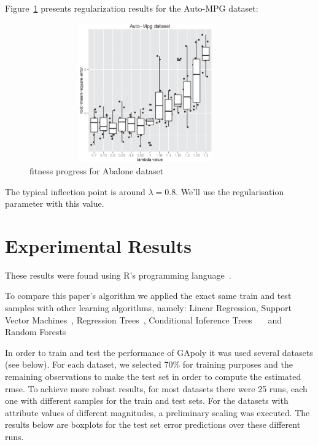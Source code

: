 \documentclass[a4paper, 12pt]{article}
\begin{document}
Figure~\ref{Auto-Mpg_dataset_lambdas} presents regularization results for the Auto-MPG dataset:

\begin{figure}[htb]
	\begin{center}
		\includegraphics[height=6cm,width=10cm,angle=0]
			{figures/Auto-Mpg_dataset_lambdas.eps}
		\caption{fitness progress for Abalone dataset}
		\label{Auto-Mpg_dataset_lambdas}
	\end{center}
\end{figure}

The typical inflection point is around $\lambda = 0.8$. We'll use the regularisation parameter with this value.

\section{Experimental Results}

These results were found using R's programming language~\cite{R}.

To compare this paper's algorithm we applied the exact same train and test samples with other learning algorithms, namely: Linear Regression, Support Vector Machines~\cite{Meyer12}, Regression Trees~\cite{Therneau13}, Conditional Inference Trees~\cite{Hothorn06}~\cite{Strobl07}~\cite{Strobl08} and Random Forests~\cite{Liaw02}

In order to train and test the performance of GApoly it was used several datasets (see below). For each dataset, we selected 70\% for training purposes and the remaining observations to make the test set in order to compute the estimated rmse. To achieve more robust results, for most datasets there were 25 runs, each one with different samples for the train and test sets. For the datasets with attribute values of different magnitudes, a preliminary scaling was executed. The results below are boxplots for the test set error predictions over these different runs.
\end{document}
